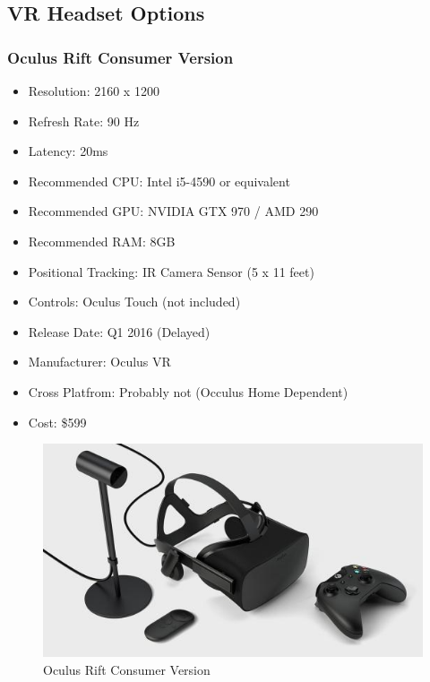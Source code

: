 \documentclass[a4paper,10pt]{article}
\begin{document}
\subsection{VR Headset Options}

\subsubsection{Oculus Rift Consumer Version}
\begin{itemize}
 \item Resolution: 2160 x 1200
 \item Refresh Rate: 90 Hz
 \item Latency: 20ms
 \item Recommended CPU: Intel i5-4590 or equivalent
 \item Recommended GPU: NVIDIA GTX 970 / AMD 290 
 \item Recommended RAM: 8GB
 \item Positional Tracking: IR Camera Sensor (5 x 11 feet)
 \item Controls: Oculus Touch (not included)
 \item Release Date: Q1 2016 (Delayed)
 \item Manufacturer: Oculus VR
 \item Cross Platfrom: Probably not (Occulus Home Dependent)
 \item Cost: \$599
\end{itemize}
\begin{figure}[H]
	\includegraphics[width=\linewidth,height=\paperheight,keepaspectratio]{cv.jpg}
	\caption{Oculus Rift Consumer Version}
	\label{fig:RiftCVImg}
	\end{figure}
	\pagebreak
\end{document}
